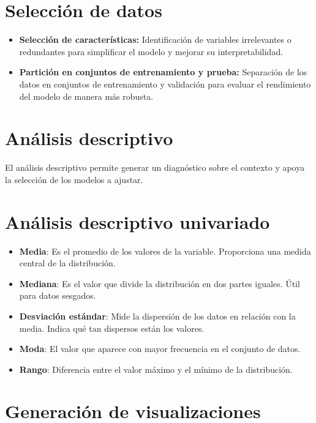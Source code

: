 \documentclass[
  letterpaper,
  DIV=11,
  numbers=noendperiod]{scrreprt}
\providecommand{\tightlist}{%
  \setlength{\itemsep}{0pt}\setlength{\parskip}{0pt}}\usepackage{longtable,booktabs,array}
\begin{document}
\section{Selección de datos}\label{selecciuxf3n-de-datos}

\begin{itemize}
\tightlist
\item
  \textbf{Selección de características:} Identificación de variables
  irrelevantes o redundantes para simplificar el modelo y mejorar su
  interpretabilidad.
\item
  \textbf{Partición en conjuntos de entrenamiento y prueba:} Separación
  de los datos en conjuntos de entrenamiento y validación para evaluar
  el rendimiento del modelo de manera más robusta.
\end{itemize}

\section{Análisis descriptivo}\label{anuxe1lisis-descriptivo}

El análisis descriptivo permite generar un diagnóstico sobre el contexto
y apoya la selección de los modelos a ajustar.

\section{Análisis descriptivo
univariado}\label{anuxe1lisis-descriptivo-univariado}

\begin{itemize}
\tightlist
\item
  \textbf{Media}: Es el promedio de los valores de la variable.
  Proporciona una medida central de la distribución.
\item
  \textbf{Mediana}: Es el valor que divide la distribución en dos partes
  iguales. Útil para datos sesgados.
\item
  \textbf{Desviación estándar}: Mide la dispersión de los datos en
  relación con la media. Indica qué tan dispersos están los valores.
\item
  \textbf{Moda}: El valor que aparece con mayor frecuencia en el
  conjunto de datos.
\item
  \textbf{Rango}: Diferencia entre el valor máximo y el mínimo de la
  distribución.
\end{itemize}

\section{Generación de
visualizaciones}\label{generaciuxf3n-de-visualizaciones}
\end{document}
